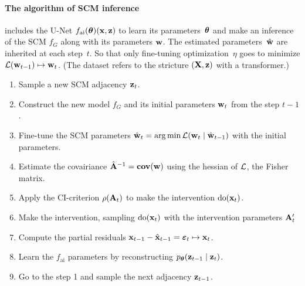 \documentclass[12pt]{article}
\begin{document}
\paragraph{The algorithm of SCM inference} includes the U-Net $f_{\text{ai}}({\boldsymbol{\theta}})(\mathbf{x},\mathbf{z})$ to learn its parameters~${\boldsymbol{\theta}}$ and make an inference of the SCM $f_G$ along with its parameters $\mathbf{w}$. The estimated parameters~$\hat{\mathbf{w}}$ are inherited at each step~$t$. So that only fine-tuning optimization~$\eta$ goes to minimize $\mathcal{L}(\mathbf{w}_{t-1})\mapsto\mathbf{w}_t$. %
(The dataset refers to the stricture  $(\mathbf{X},\mathbf{z})$ with a transformer.) 

\begin{enumerate}
\item Sample a new SCM adjacency $\mathbf{z}_t$.
\item Construct the new model $f_G$ and its initial parameters $\mathbf{w}_t$ from the step $t-1$.
\item Fine-tune the SCM parameters $\hat{\mathbf{w}}_t = \arg\min \mathcal{L}(\mathbf{w}_t \mid \hat{\mathbf{w}}_{t-1})$ with the initial parameters.
\item Estimate the covairiance $\hat{\mathbf{A}}^{-1} = \textbf{cov}(\mathbf{w})$ using the hessian of $\mathcal{L}$, the Fisher matrix.
\item Apply the CI-criterion $\rho(\mathbf{A}_t)$  to make the intervention $\mathrm{do}(\mathbf{x}_t)$.
\item Make the intervention, sampling $\mathrm{do}(\mathbf{x}_t)$ with the intervention parameters $\mathbf{A}^\prime_t$
\item Compute the partial residuals $ \mathbf{x}_{t-1} - \hat{\mathbf{x}}_{t-1}= {\boldsymbol{\varepsilon}}_t \mapsto \mathbf{x}_t$.
\item Learn the $f_\text{ai}$ parameters by reconstructing $p_{\boldsymbol{\theta}}(\mathbf{z}_{t-1} \mid \mathbf{z}_t)$.
\item Go to the step 1 and sample the next adjacency $\mathbf{z}_{t-1}$.
\end{enumerate}
\end{document}
